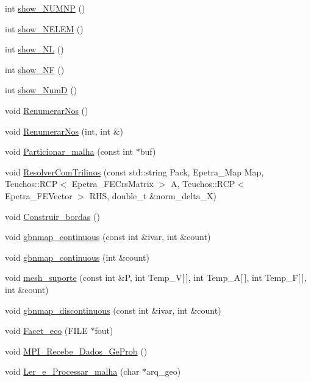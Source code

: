 \begin{DoxyCompactItemize}
\item 
int \hyperlink{classGeProb_a9470702789ccb98b8c952d3259bcba7f}{show\+\_\+\+N\+U\+M\+NP} ()
\item 
int \hyperlink{classGeProb_aa9c2c6d251e061c3cf58806097c55f04}{show\+\_\+\+N\+E\+L\+EM} ()
\item 
int \hyperlink{classGeProb_a6a4db729e1c6eab1165fb861b16649ac}{show\+\_\+\+NL} ()
\item 
int \hyperlink{classGeProb_ac7f36c8a5ae46b8ddc8cdd8db059e9cc}{show\+\_\+\+NF} ()
\item 
int \hyperlink{classGeProb_a95d6202865332fd522738383003d7b25}{show\+\_\+\+NumD} ()
\item 
void \hyperlink{classGeProb_a18cfc81b7accb83b55b9e69d2738c5de}{Renumerar\+Nos} ()
\item 
void \hyperlink{classGeProb_aa656597aedeff1096736c98b1f51c55f}{Renumerar\+Nos} (int, int \&)
\item 
void \hyperlink{classGeProb_ac439ec4e4198924d385d8948edb20708}{Particionar\+\_\+malha} (const int $\ast$buf)
\item 
void \hyperlink{classGeProb_a479ff26c0f91f09a7b92cabf9894c64e}{Resolver\+Com\+Trilinos} (const std\+::string Pack, Epetra\+\_\+\+Map Map, Teuchos\+::\+R\+CP$<$ Epetra\+\_\+\+F\+E\+Crs\+Matrix $>$ A, Teuchos\+::\+R\+CP$<$ Epetra\+\_\+\+F\+E\+Vector $>$ R\+HS, double\+\_\+t \&norm\+\_\+delta\+\_\+X)
\item 
void \hyperlink{classGeProb_ab622a6354ec337bab6c2563049b0db4f}{Construir\+\_\+bordas} ()
\item 
void \hyperlink{classGeProb_aa2d34febad6985ceacd95ba6e10536f8}{gbnmap\+\_\+continuous} (const int \&ivar, int \&count)
\item 
void \hyperlink{classGeProb_a4a405a3f566e10cf77906d21606c97bd}{gbnmap\+\_\+continuous} (int \&count)
\item 
void \hyperlink{classGeProb_ab33e0027b5ae2b712b91690b8cb75e90}{mesh\+\_\+suporte} (const int \&P, int Temp\+\_\+V\mbox{[}$\,$\mbox{]}, int Temp\+\_\+A\mbox{[}$\,$\mbox{]}, int Temp\+\_\+F\mbox{[}$\,$\mbox{]}, int \&count)
\item 
void \hyperlink{classGeProb_a4ceec7b2e7cad8ba29dd8d751840a22b}{gbnmap\+\_\+discontinuous} (const int \&ivar, int \&count)
\item 
void \hyperlink{classGeProb_ae30b85570c7c33bb4429f9ed91532807}{Facet\+\_\+eco} (F\+I\+LE $\ast$fout)
\item 
void \hyperlink{classGeProb_a79ef11abf1d43923fb5a3613a3fa654e}{M\+P\+I\+\_\+\+Recebe\+\_\+\+Dados\+\_\+\+Ge\+Prob} ()
\item 
void \hyperlink{classGeProb_ac1030cadfbc0d88e817617a927dbc31f}{Ler\+\_\+e\+\_\+\+Processar\+\_\+malha} (char $\ast$arq\+\_\+geo)
\end{DoxyCompactItemize}
